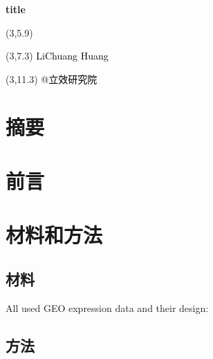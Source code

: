 \documentclass[
]{article}
\author{}
\date{\vspace{-2.5em}}
\begin{document}
\begin{titlepage} 
\begin{center} \textbf{\Huge title} \vspace{4em}
\begin{textblock}{10}(3,5.9) \huge
\textbf{\textcolor{white}{2023-11-21}}
\end{textblock} \begin{textblock}{10}(3,7.3)
\Large \textcolor{black}{LiChuang Huang}
\end{textblock} \begin{textblock}{10}(3,11.3)
\Large \textcolor{black}{@立效研究院}
\end{textblock} \end{center} \end{titlepage}
\restoregeometry


\tableofcontents

\listoffigures

\listoftables

\newpage


\hypertarget{abstract}{%
\section{摘要}\label{abstract}}

\hypertarget{introduction}{%
\section{前言}\label{introduction}}

\hypertarget{methods}{%
\section{材料和方法}\label{methods}}

\hypertarget{ux6750ux6599}{%
\subsection{材料}\label{ux6750ux6599}}

All used GEO expression data and their design:

\hypertarget{ux65b9ux6cd5}{%
\subsection{方法}\label{ux65b9ux6cd5}}
\end{document}
